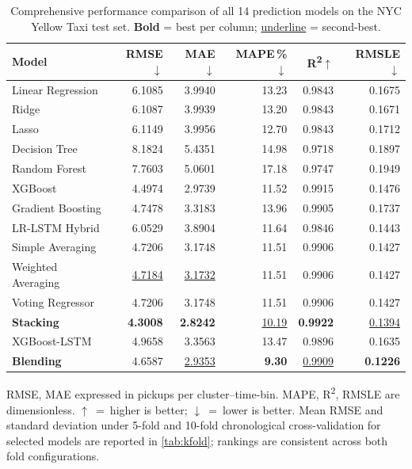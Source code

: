 \documentclass[a4paper,fleqn]{cas-dc}
\begin{document}
\begin{table}[t]
\centering
\caption{Comprehensive performance comparison of all 14 prediction models on the NYC Yellow Taxi test set. \textbf{Bold} = best per column; \underline{underline} = second-best.\label{tab:results_full}}
\begin{threeparttable}
\begin{tabular*}{\textwidth}{@{\extracolsep\fill}lrrrrr@{}}
\toprule
\textbf{Model} & \textbf{RMSE}$\downarrow$ & \textbf{MAE}$\downarrow$ & \textbf{MAPE\,\%}$\downarrow$ & \textbf{R\textsuperscript{2}}$\uparrow$ & \textbf{RMSLE}$\downarrow$ \\
\toprule
Linear Regression   & 6.1085 & 3.9940 & 13.23 & 0.9843 & 0.1675 \\
Ridge               & 6.1087 & 3.9939 & 13.20 & 0.9843 & 0.1671 \\
Lasso               & 6.1149 & 3.9956 & 12.70 & 0.9843 & 0.1712 \\
Decision Tree       & 8.1824 & 5.4351 & 14.98 & 0.9718 & 0.1897 \\
Random Forest       & 7.7603 & 5.0601 & 17.18 & 0.9747 & 0.1949 \\
XGBoost             & 4.4974 & 2.9739 & 11.52 & 0.9915 & 0.1476 \\
Gradient Boosting   & 4.7478 & 3.3183 & 13.96 & 0.9905 & 0.1737 \\
LR-LSTM Hybrid      & 6.0529 & 3.8904 & 11.64 & 0.9846 & 0.1443 \\
Simple Averaging    & 4.7206 & 3.1748 & 11.51 & 0.9906 & 0.1427 \\
Weighted Averaging  & \underline{4.7184} & \underline{3.1732} & 11.51 & 0.9906 & 0.1427 \\
Voting Regressor    & 4.7206 & 3.1748 & 11.51 & 0.9906 & 0.1427 \\
\textbf{Stacking}   & \textbf{4.3008} & \textbf{2.8242} & \underline{10.19} & \textbf{0.9922} & \underline{0.1394} \\
XGBoost-LSTM        & 4.9658 & 3.3563 & 13.47 & 0.9896 & 0.1635 \\
\textbf{Blending}   & 4.6587 & \underline{2.9353} & \textbf{9.30}  & \underline{0.9909} & \textbf{0.1226} \\
\bottomrule
\end{tabular*}
\begin{tablenotes}
  \small
  \item RMSE, MAE expressed in pickups per cluster--time-bin. MAPE, R\textsuperscript{2}, RMSLE are dimensionless. $\uparrow$~=~higher is better; $\downarrow$~=~lower is better. Mean RMSE and standard deviation under 5-fold and 10-fold chronological cross-validation for selected models are reported in \autoref{tab:kfold}; rankings are consistent across both fold configurations.
\end{tablenotes}
\end{threeparttable}
\end{table}
\end{document}

